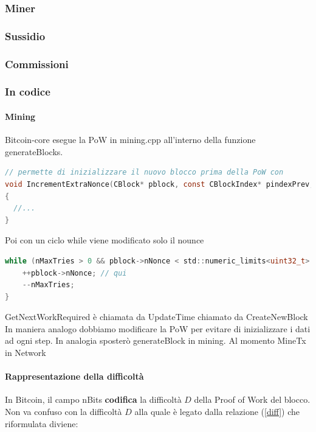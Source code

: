 \documentclass{article}
\begin{document}
\subsubsection{Miner}
\subsubsection{Sussidio}
\subsubsection{Commissioni}
\subsubsection{In codice}

\paragraph{Mining}
Bitcoin-core esegue la PoW in mining.cpp all'interno della funzione generateBlocks.

\lstset{style=mystyle}
\begin{lstlisting}[language=c]
// permette di inizializzare il nuovo blocco prima della PoW con
void IncrementExtraNonce(CBlock* pblock, const CBlockIndex* pindexPrev, unsigned int& nExtraNonce)
{
  //...
}
\end{lstlisting}

Poi con un ciclo while viene modificato solo il nounce

\lstset{style=mystyle}
\begin{lstlisting}[language=c]
while (nMaxTries > 0 && pblock->nNonce < std::numeric_limits<uint32_t>::max() && !CheckProofOfWork(pblock->GetHash(), pblock->nBits, Params().GetConsensus()) && !ShutdownRequested()) {
    ++pblock->nNonce; // qui
    --nMaxTries;
}
\end{lstlisting}

GetNextWorkRequired è chiamata da UpdateTime chiamato da CreateNewBlock
In maniera analogo dobbiamo modificare la PoW per evitare di inizializzare i dati ad ogni step.
In analogia sposterò generateBlock in mining. Al momento MineTx in Network

\paragraph{Rappresentazione della difficoltà}


In Bitcoin, il campo nBits \textbf{codifica} la difficoltà $D$ della Proof of Work del blocco.
Non va confuso con la difficoltà $D$ alla quale è legato dalla relazione (\ref{diff}) che riformulata diviene:
\end{document}

